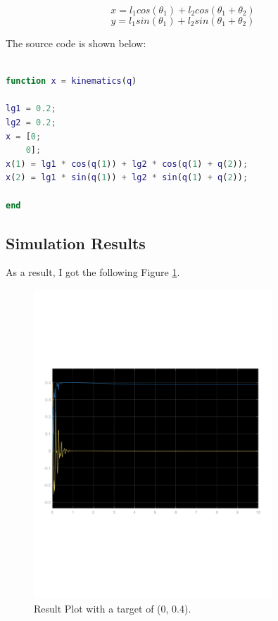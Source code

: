 \documentclass{article}
\begin{document}
\begin{equation}
    x = l_1 cos(\theta_1) + l_2 cos(\theta_1 + \theta_2)
\end{equation}
\begin{equation}
    y = l_1 sin(\theta_1) + l_2 sin(\theta_1 + \theta_2)
\end{equation}


The source code is shown below:
\begin{lstlisting}[language=Matlab,  basicstyle=\small\ttfamily]

function x = kinematics(q)

lg1 = 0.2;
lg2 = 0.2;
x = [0;
    0];
x(1) = lg1 * cos(q(1)) + lg2 * cos(q(1) + q(2));
x(2) = lg1 * sin(q(1)) + lg2 * sin(q(1) + q(2));

end

\end{lstlisting}

\subsection{Simulation Results}

As a result, I got the following Figure \ref{fig:result_task_space_plot}. \\
\begin{figure}[ht]
    \centering
    \includegraphics[width=0.8\textwidth]{figures/result_task_space.pdf}
    \caption{Result Plot with a target of (0, 0.4).}
    \label{fig:result_task_space_plot}
\end{figure}
\end{document}
